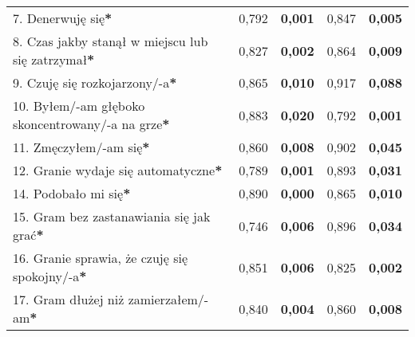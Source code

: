 \begin{table}[!h]
\begin{center}
\begin{tabular}{|m{10em}|m{5em}|m{5em}|m{5em}|m{5em}|}
            7. Denerwuję się\textbf{*}                                                  & 0,792                             & \textbf{0,001}         & 0,847                         & \textbf{0,005}     \\
            8. Czas jakby stanął w miejscu lub się zatrzymał\textbf{*}                  & 0,827                             & \textbf{0,002}         & 0,864                         & \textbf{0,009}     \\
            9. Czuję się \newline rozkojarzony/-a\textbf{*}                             & 0,865                             & \textbf{0,010}         & 0,917                         & \textbf{0,088}     \\
            10. Byłem/-am głęboko \newline skoncentrowany/-a \newline na grze\textbf{*} & 0,883                             & \textbf{0,020}         & 0,792                         & \textbf{0,001}     \\
            11. Zmęczyłem/-am się\textbf{*}                                             & 0,860                             & \textbf{0,008}         & 0,902                         & \textbf{0,045}     \\
            12. Granie wydaje się automatyczne\textbf{*}                                & 0,789                             & \textbf{0,001}         & 0,893                         & \textbf{0,031}     \\
            14. Podobało mi się\textbf{*}                                               & 0,890                             & \textbf{0,000}         & 0,865                         & \textbf{0,010}     \\
            15. Gram bez zastanawiania się jak grać\textbf{*}                           & 0,746                             & \textbf{0,006}         & 0,896                         & \textbf{0,034}     \\
            16. Granie sprawia, \newline że czuję się spokojny/-a\textbf{*}             & 0,851                             & \textbf{0,006}         & 0,825                         & \textbf{0,002}     \\
            17. Gram dłużej \newline niż zamierzałem/-am\textbf{*}                      & 0,840                             & \textbf{0,004}         & 0,860                         & \textbf{0,008}     \\

\end{tabular}
\end{center}
\end{table}
